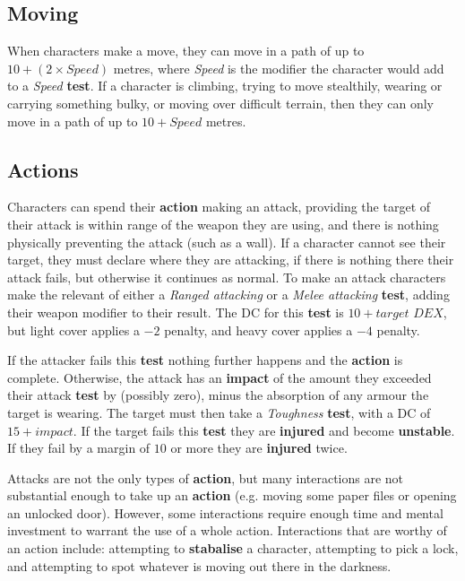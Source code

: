 \documentclass[11pt]{article}
\begin{document}
\begin{multicols}{3}
  \subsection*{Moving}

  When characters make a move, they can move in a path of up to $10 + (2 \times Speed)$ metres, where \textit{Speed} is the modifier the character would add to a \textit{Speed} \textbf{test}. If a character is climbing, trying to move stealthily, wearing or carrying something bulky, or moving over difficult terrain, then they can only move in a path of up to $10 + Speed$ metres.

  \subsection*{Actions}

  Characters can spend their \textbf{action} making an attack, providing the target of their attack is within range of the weapon they are using, and there is nothing physically preventing the attack (such as a wall). If a character cannot see their target, they must declare where they are attacking, if there is nothing there their attack fails, but otherwise it continues as normal. To make an attack characters make the relevant of either a \textit{​Ranged attacking​} or a \textit{​Melee attacking​​}  \textbf{test​}, adding their weapon modifier to their result. The DC for this ​\textbf{test​} is $10 + target$ $DEX$, but light cover applies a $-2$ penalty, and heavy cover applies a $-4$ penalty.

  If the attacker fails this \textbf{test} nothing further happens and the \textbf{action} is complete. Otherwise, the attack has an \textbf{impact} of the amount they exceeded their attack \textbf{test} by (possibly zero), minus the absorption of any armour the target is wearing. The target must then take a \textit{Toughness} \textbf{test}, with a DC of $15 + impact$. If the target fails this \textbf{test} they are \textbf{injured} and become \textbf{unstable}. If they fail by a margin of $10$ or more they are \textbf{injured} twice.

  Attacks are not the only types of \textbf{action}, but many interactions are not substantial enough to take up an \textbf{action} (e.g. moving some paper files or opening an unlocked door). However, some interactions require enough time and mental investment to warrant the use of a whole action. Interactions that are worthy of an action include: attempting to \textbf{stabalise} a character, attempting to pick a lock, and attempting to spot whatever is moving out there in the darkness.


\end{multicols}
\end{document}

